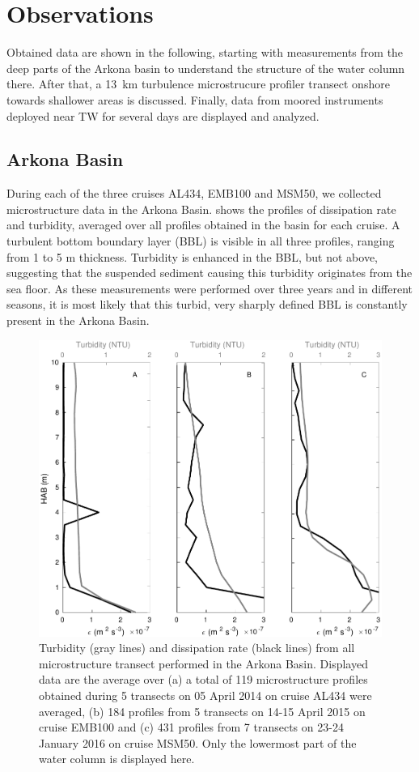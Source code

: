 \section{Observations}

Obtained data are shown in the following, starting with measurements from the 
deep parts of the Arkona basin to understand the structure of the water 
column there. After that, a 13~km turbulence microstrucure profiler transect 
onshore towards shallower areas is discussed. Finally, data from moored 
instruments deployed near TW for several days are displayed and analyzed.

\subsection{Arkona Basin}

 During each of the three cruises AL434, EMB100 and MSM50, we collected 
microstructure data in the Arkona Basin.  shows the profiles of 
dissipation rate and turbidity, averaged over all profiles obtained in the 
basin for each cruise. A turbulent bottom boundary layer (BBL) is visible in 
all three profiles, ranging from 1 to 5 m thickness. 
Turbidity is enhanced in the BBL, but not above, suggesting that the suspended 
sediment causing this turbidity originates from the sea floor. As these 
measurements were performed over three years and in different 
seasons, it is most likely that this turbid, very sharply defined BBL is 
constantly present in the Arkona Basin.

   \begin{figure}[ht]
\includegraphics[width=15cm]{bilder/arkona_mss.pdf}
 \caption{Turbidity (gray lines) and dissipation rate (black lines) from all 
microstructure transect performed in the Arkona Basin. Displayed data are the 
average over (a) a total of 119 microstructure profiles obtained during 5 
transects on 05 April 2014 on cruise AL434 were averaged, (b) 184 profiles from 
5 transects on 14-15 April 2015 on cruise EMB100 and (c) 431 profiles from 7 
transects on 23-24 January 2016 on cruise MSM50. Only the lowermost part of 
the water column is displayed here.}
 \label{abmss}
 \end{figure}


